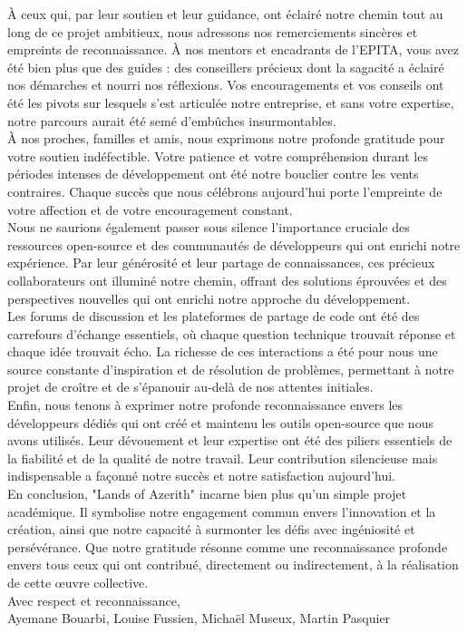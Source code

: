 À ceux qui, par leur soutien et leur guidance, ont éclairé notre chemin tout au long de ce projet ambitieux, nous adressons nos remerciements sincères
 et empreints de reconnaissance. À nos mentors et encadrants de l'EPITA, vous avez été bien plus que des guides : des conseillers précieux dont la sagacité 
 a éclairé nos démarches et nourri nos réflexions. Vos encouragements et vos conseils ont été les pivots sur lesquels s'est articulée notre entreprise, et sans votre
  expertise, notre parcours aurait été semé d'embûches insurmontables.
\\

À nos proches, familles et amis, nous exprimons notre profonde gratitude pour votre soutien indéfectible. Votre patience et votre compréhension durant 
les périodes intenses de développement ont été notre bouclier contre les vents contraires. Chaque succès que nous célébrons aujourd'hui porte l'empreinte 
de votre affection et de votre encouragement constant.
\\

Nous ne saurions également passer sous silence l'importance cruciale des ressources open-source et des communautés de développeurs qui ont enrichi notre expérience.
 Par leur générosité et leur partage de connaissances, ces précieux collaborateurs ont illuminé notre chemin, offrant des solutions éprouvées et des perspectives 
 nouvelles qui ont enrichi notre approche du développement.
\\

Les forums de discussion et les plateformes de partage de code ont été des carrefours d'échange essentiels, où chaque question technique trouvait réponse et chaque
 idée trouvait écho. La richesse de ces interactions a été pour nous une source constante d'inspiration et de résolution de problèmes, permettant à notre projet de
  croître et de s'épanouir au-delà de nos attentes initiales.
\\

Enfin, nous tenons à exprimer notre profonde reconnaissance envers les développeurs dédiés qui ont créé et maintenu les outils open-source que nous avons utilisés.
 Leur dévouement et leur expertise ont été des piliers essentiels de la fiabilité et de la qualité de notre travail. Leur contribution silencieuse mais indispensable 
 a façonné notre succès et notre satisfaction aujourd'hui.
\\

En conclusion, "Lands of Azerith" incarne bien plus qu'un simple projet académique. Il symbolise notre engagement commun envers l'innovation et la création, ainsi 
que notre capacité à surmonter les défis avec ingéniosité et persévérance. Que notre gratitude résonne comme une reconnaissance profonde envers tous ceux qui ont 
contribué, directement ou indirectement, à la réalisation de cette œuvre collective.
\\

Avec respect et reconnaissance,
\\

Ayemane Bouarbi, Louise Fussien, Michaël Museux, Martin Pasquier